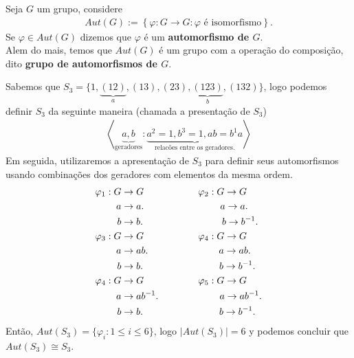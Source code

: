 \begin{definition}
  Seja $G$ um grupo, considere
  \begin{align*}
    Aut(G):=\left\{ \varphi:G\to G: \varphi\text{ é isomorfismo} \right\}.
  \end{align*}
  Se $\varphi\in Aut(G)$ dizemos que $\varphi$ é um \textbf{automorfismo de $G$}.\\
  Alem do mais, temos que $Aut(G)$ é um grupo com a operação do composição, dito \textbf{grupo de automorfismos de $G$}. 
\end{definition}
\begin{example}[$S_3$]
  Sabemos que $S_3=\{1,\underbrace{(12)}_{a},(13),(23),\underbrace{(123)}_{b},(132)\}$, logo podemos definir $S_3$ da seguinte maneira (chamada a presentação de $S_3$)
  \begin{align*}
    \left\langle \underbrace{a,b}_{\text{geradores}}:\underbrace{a^{2}=1,b^{3}=1,ab=b^{1}a}_{\text{relacões entre os geradores.}} \right\rangle
  \end{align*}
  Em seguida, utilizaremos a apresentação de $S_3$ para definir seus automorfismos usando combinações dos geradores com elementos da mesma ordem.
  \begin{align*}
    \varphi_1:G&\to G\hspace{2cm} \varphi_2:G\to G\\
    a&\to a.\hspace{2.8cm} a\to a.\\
    b&\to b.\hspace{2.9cm} b\to b^{-1}.\\
    \varphi_3:G&\to G\hspace{2cm} \varphi_4:G\to G\\
    a&\to ab.\hspace{2.6cm} a\to ab.\\
    b&\to b.\hspace{2.8cm} b\to b^{-1}.\\
    \varphi_4:G&\to G\hspace{2cm} \varphi_5:G\to G\\
    a&\to ab^{-1}.\hspace{2.25cm} a\to ab^{-1}.\\
    b&\to b.\hspace{2.8cm} b\to b^{-1}.\\
  \end{align*}
  Então, $Aut(S_3)=\{\varphi_i:1\leq i\leq 6\}$, logo $|Aut(S_3)|=6$ y podemos concluir que $Aut(S_3)\cong S_3$. 
\end{example}
